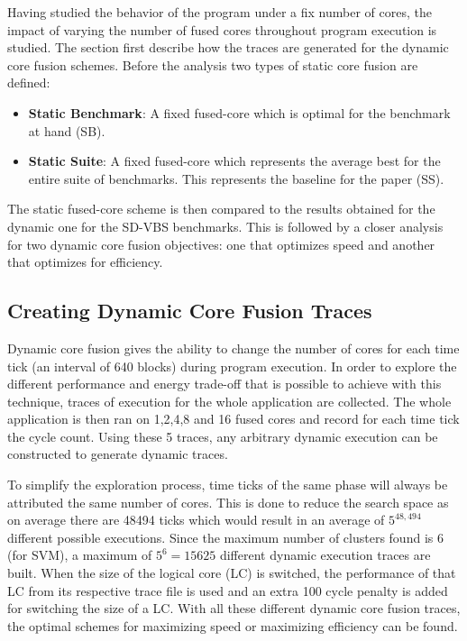 
Having studied the behavior of the program under a fix number of cores, the impact of varying the number of fused cores throughout program execution is studied.
The section first describe how the traces are generated for the dynamic core fusion schemes.
Before the analysis two types of static core fusion are defined:
\begin{itemize}
	\item \textbf{Static Benchmark}: A fixed fused-core which is optimal for the benchmark at hand (SB).
	\item \textbf{Static Suite}: A fixed fused-core which represents the average best for the entire suite of benchmarks. This represents the baseline for the paper (SS).
\end{itemize}
The static fused-core scheme is then compared to the results obtained for the dynamic one for the SD-VBS benchmarks.
This is followed by a closer analysis for two dynamic core fusion objectives: one that optimizes speed and another that optimizes for efficiency.

\subsection{Creating Dynamic Core Fusion Traces}

Dynamic core fusion gives the ability to change the number of cores for each time tick (an interval of 640 blocks) during program execution.
In order to explore the different performance and energy trade-off that is possible to achieve with this technique, traces of execution for the whole application are collected.
The whole application is then ran on 1,2,4,8 and 16 fused cores and record for each time tick the cycle count.
Using these 5 traces, any arbitrary dynamic execution can be constructed to generate dynamic traces.

To simplify the exploration process, time ticks of the same phase will always be attributed the same number of cores.
This is done to reduce the search space as on average there are 48494 ticks which would result in an average of $5^{48,494}$ different possible executions.
Since the maximum number of clusters found is 6 (for SVM), a maximum of $5^{6} = 15625$ different dynamic execution traces are built.
When the size of the logical core (LC) is switched, the performance of that LC from its respective trace file is used and an extra 100 cycle penalty is added for switching the size of a LC.
With all these different dynamic core fusion traces, the optimal schemes for maximizing speed or maximizing efficiency can be found.

